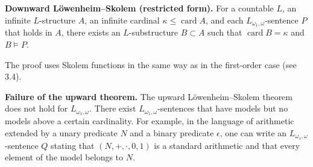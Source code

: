 \textbf{Downward Löwenheim–Skolem (restricted form).} For a countable $L$, an infinite $L$-structure $A$, an infinite cardinal $\kappa \leq \operatorname{card}A$, and each $L_{\omega_1,\omega}$-sentence $P$ that holds in $A$, there exists an $L$-substructure $B \subset A$ such that $\operatorname{card}B = \kappa$ and $B \models P$.

The proof uses Skolem functions in the same way as in the first-order case (see 3.4).

\textbf{Failure of the upward theorem.} The upward Löwenheim–Skolem theorem does not hold for $L_{\omega_1,\omega}$. There exist $L_{\omega_1,\omega}$-sentences that have models but no models above a certain cardinality. For example, in the language of arithmetic extended by a unary predicate $N$ and a binary predicate $\epsilon$, one can write an $L_{\omega_1,\omega}$-sentence $Q$ stating that $(N, +, \cdot, 0, 1)$ is a standard arithmetic and that every element of the model belongs to $N$.
